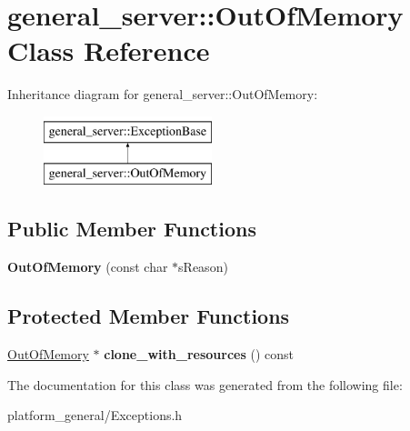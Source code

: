 \hypertarget{classgeneral__server_1_1OutOfMemory}{\section{general\-\_\-server\-:\-:\-Out\-Of\-Memory \-Class \-Reference}
\label{classgeneral__server_1_1OutOfMemory}
}
\-Inheritance diagram for general\-\_\-server\-:\-:\-Out\-Of\-Memory\-:\begin{figure}[H]
\begin{center}
\leavevmode
\includegraphics[height=2.000000cm]{classgeneral__server_1_1OutOfMemory}
\end{center}
\end{figure}
\subsection*{\-Public \-Member \-Functions}
\begin{DoxyCompactItemize}
\item 
\hypertarget{classgeneral__server_1_1OutOfMemory_a54a8ce34612136c8cdf837ed42920386}{{\bfseries \-Out\-Of\-Memory} (const char $\ast$s\-Reason)}\label{classgeneral__server_1_1OutOfMemory_a54a8ce34612136c8cdf837ed42920386}

\end{DoxyCompactItemize}
\subsection*{\-Protected \-Member \-Functions}
\begin{DoxyCompactItemize}
\item 
\hypertarget{classgeneral__server_1_1OutOfMemory_a2da50cfdf724447ff53fbfd8f5f64a65}{\hyperlink{classgeneral__server_1_1OutOfMemory}{\-Out\-Of\-Memory} $\ast$ {\bfseries clone\-\_\-with\-\_\-resources} () const }\label{classgeneral__server_1_1OutOfMemory_a2da50cfdf724447ff53fbfd8f5f64a65}

\end{DoxyCompactItemize}


\-The documentation for this class was generated from the following file\-:\begin{DoxyCompactItemize}
\item 
platform\-\_\-general/\-Exceptions.\-h\end{DoxyCompactItemize}
